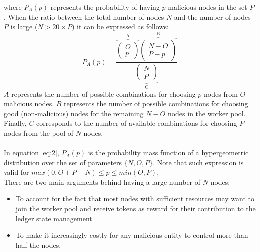 where $P_{A}(p)$ represents the probability of having $p$ malicious nodes in the set $P$. When the ratio between the total number of nodes $N$ and the number of nodes $P$ is large ($N > 20\times P$) it can be expressed as follows: 
\begin{equation}
\label{eq:2}
P_{A}(p) = \frac{\overbrace{\left( \begin{array}{c} O \\
p \end{array} \right)}^\text{A} 
\overbrace{\left( \begin{array}{c} N - O \\ P - p \end{array} \right)}^\text{B}}{\underbrace{\left( \begin{array}{c} N \\
P \end{array} \right)}_\text{C}}
\end{equation}
$A$ represents the number of possible combinations for choosing $p$ nodes from $O$ malicious nodes. $B$ represents the number of possible combinations for choosing good (non-malicious) nodes for the remaining $N-O$ nodes in the worker pool. Finally, $C$ corresponds to the number of available combinations for choosing $P$ nodes from the pool of $N$ nodes.\\
\\
In equation \ref{eq:2}, $P_A(p)$ is the probability mass function of a hypergeometric distribution over the set of parameters $\{N,O,P\}$. Note that such expression is valid for $max(0,O+P-N) \leq p \leq min(O,P)$. \\

There are two main arguments behind having a large number of $N$ nodes:

\begin{itemize}
 \item To account for the fact that most nodes with sufficient resources may want to join the worker pool and receive tokens as reward for their contribution to the ledger state management
\item To make it increasingly costly for any malicious entity to control more than half the nodes.
\end{itemize}

